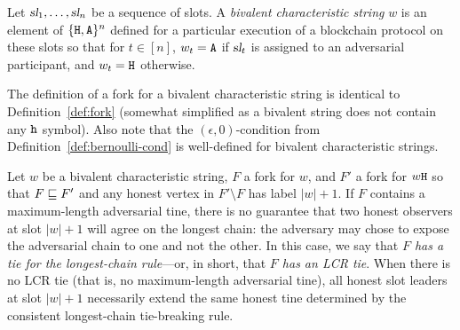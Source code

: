   \begin{definition}\label{def:bivalent-char-string}
    Let $\textsl{sl}_1, \ldots, \textsl{sl}_{n}$ be a sequence of slots. 
    A \emph{bivalent characteristic string} $w$ 
    is an element of $\{\mathtt{H},\mathtt{A}\}^n$ 
    defined for a particular execution of a blockchain protocol on these slots so that 
    for $t \in [n]$, 
    $w_t = \mathtt{A}$ if $\textsl{sl}_{t}$ is assigned to an adversarial participant, 
    and $w_t = \mathtt{H}$ otherwise.
  \end{definition}
  The definition of a fork for a bivalent characteristic string is
  identical to Definition~\ref{def:fork} (somewhat simplified as a
  bivalent string does not contain any $\mathtt{h}$ symbol).
  Also note that the $(\epsilon, 0)$-condition 
  from Definition~\ref{def:bernoulli-cond} 
  is well-defined for bivalent characteristic strings.

  Let $w$ be a bivalent characteristic string, $F$ a fork for $w$, and
  $F'$ a fork for $w\mathtt{H}$ so that $F \sqsubseteq F'$ and any honest
  vertex in $F' \setminus F$ has label $|w| + 1$.  If $F$ contains a
  maximum-length adversarial tine, there is no guarantee that two
  honest observers at slot $|w| + 1$ will agree on the longest chain:
  the adversary may chose to expose the adversarial chain to one and
  not the other.
  In this case, we say that \emph{$F$ has a tie for the longest-chain
  rule}---or, in short, that \emph{$F$ has an LCR tie}.  
  When there
  is no LCR tie (that is, no maximum-length adversarial tine), all
  honest slot leaders at slot $|w| + 1$ necessarily extend the same
  honest tine determined by the consistent longest-chain tie-breaking
  rule.




